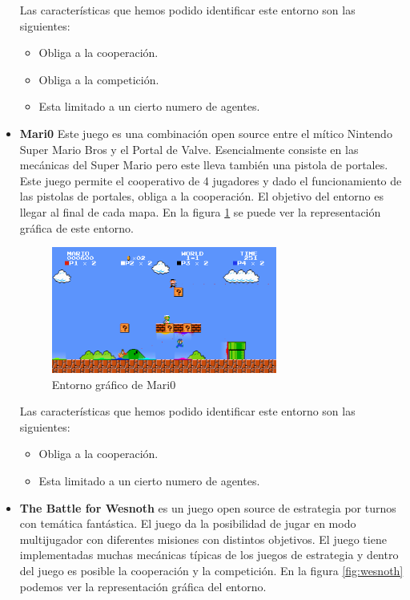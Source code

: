 \begin{itemize}
	      Las características que hemos podido identificar este entorno son las siguientes:
	      \begin{itemize}
		      \item Obliga a la cooperación.
		      \item Obliga a la competición.
		      \item Esta limitado a un cierto numero de agentes.
	      \end{itemize}

	\item \textbf{Mari0} \cite{mari0} Este juego es una combinación open source entre el mítico Nintendo Super Mario Bros y el Portal de Valve. Esencialmente consiste en las mecánicas del Super Mario pero este lleva también una pistola de portales. Este juego permite el cooperativo de 4 jugadores y dado el funcionamiento de las pistolas de portales, obliga a la cooperación. El objetivo del entorno es llegar al final de cada mapa. En la figura \ref {fig:mari0} se puede ver la representación gráfica de este entorno.

	      \begin{figure}[ht]
		      \centering
		      \includegraphics[width=0.7\textwidth]{img/mari0-1.png}
		      \caption{Entorno gráfico de Mari0 \cite{mari0}}
		      \label{fig:mari0}
	      \end{figure}

	      Las características que hemos podido identificar este entorno son las siguientes:
	      \begin{itemize}
		      \item Obliga a la cooperación.
		      \item Esta limitado a un cierto numero de agentes.
	      \end{itemize}

	\item \textbf{The Battle for Wesnoth} \cite{wesnoth} es un juego open source de estrategia por turnos con temática fantástica. El juego da la posibilidad de jugar en modo multijugador con diferentes misiones con distintos objetivos. El juego tiene implementadas muchas mecánicas típicas de los juegos de estrategia y dentro del juego es posible la cooperación y la competición. En la figura \ref {fig:wesnoth} podemos ver la representación gráfica del entorno.


\end{itemize}
